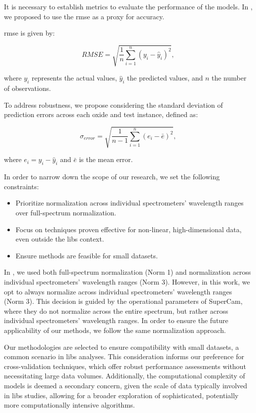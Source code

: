 It is necessary to establish metrics to evaluate the performance of the models.
In \cite{p9_paper}, we proposed to use the \gls{rmse} as a proxy for accuracy.

\gls{rmse} is given by:

\begin{equation}
    RMSE = \sqrt{\frac{1}{n} \sum_{i=1}^{n} (y_i - \hat{y}_i)^2},
\end{equation}

where $y_i$ represents the actual values, $\hat{y}_i$ the predicted values, and $n$ the number of observations.

To address robustness, we propose considering the standard deviation of prediction errors across each oxide and test instance, defined as:

\begin{equation}
    \sigma_{error} = \sqrt{\frac{1}{n-1} \sum_{i=1}^{n} (e_i - \bar{e})^2},
\end{equation}

where $e_i = y_i - \hat{y}_i$ and $\bar{e}$ is the mean error.

In order to narrow down the scope of our research, we set the following constraints:
\begin{itemize}
    \item Prioritize normalization across individual spectrometers' wavelength ranges over full-spectrum normalization.
    \item Focus on techniques proven effective for non-linear, high-dimensional data, even outside the \gls{libs} context.
    \item Ensure methods are feasible for small datasets.
\end{itemize}

In \cite{p9_paper}, we used both full-spectrum normalization (Norm 1) and normalization across individual spectrometers' wavelength ranges (Norm 3).
However, in this work, we opt to always normalize across individual spectrometers' wavelength ranges (Norm 3).
This decision is guided by the operational parameters of SuperCam\cite{andersonPostlandingMajorElement2022}, where they do not normalize across the entire spectrum, but rather across individual spectrometers' wavelength ranges.
In order to ensure the future applicability of our methods, we follow the same normalization approach.

Our methodologies are selected to ensure compatibility with small datasets, a common scenario in \gls{libs} analyses.
This consideration informs our preference for cross-validation techniques, which offer robust performance assessments without necessitating large data volumes.
Additionally, the computational complexity of models is deemed a secondary concern, given the scale of data typically involved in \gls{libs} studies, allowing for a broader exploration of sophisticated, potentially more computationally intensive algorithms.

